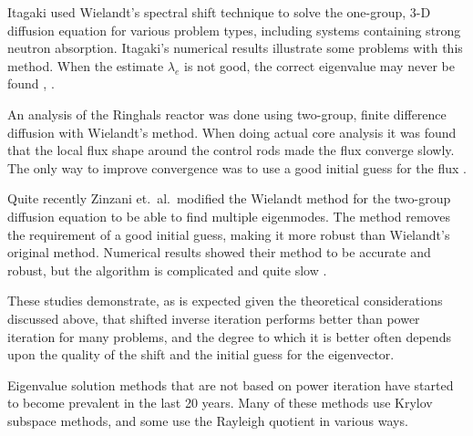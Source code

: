Itagaki used Wielandt's spectral shift technique to solve the one-group, 3-D diffusion equation for various problem types, including systems containing strong neutron absorption. Itagaki's numerical results illustrate some problems with this method. When the estimate $\lambda_e$ is not good, the correct eigenvalue may never be found \cite{Itagaki1996}, \cite{Itagaki2002}. 

An analysis of the Ringhals reactor was done using two-group, finite difference diffusion with Wielandt's method. When doing actual core analysis it was found that the local flux shape around the control rods made the flux converge slowly. The only way to improve convergence was to use a good initial guess for the flux \cite{Hotta1997}. 

Quite recently Zinzani et.\ al.\ modified the Wielandt method for the two-group diffusion equation to be able to find multiple eigenmodes. The method removes the requirement of a good initial guess, making it more robust than Wielandt's original method. %
%
Numerical results showed their method to be accurate and robust, but the algorithm is complicated and quite slow \cite{Zinzani2008}.%

These studies demonstrate, as is expected given the theoretical considerations discussed above, that shifted inverse iteration performs better than power iteration for many problems, and the degree to which it is better often depends upon the quality of the shift and the initial guess for the eigenvector.

Eigenvalue solution methods that are not based on power iteration have started to become prevalent in the last 20 years. Many of these methods use Krylov subspace methods, and some use the Rayleigh quotient in various ways. 

